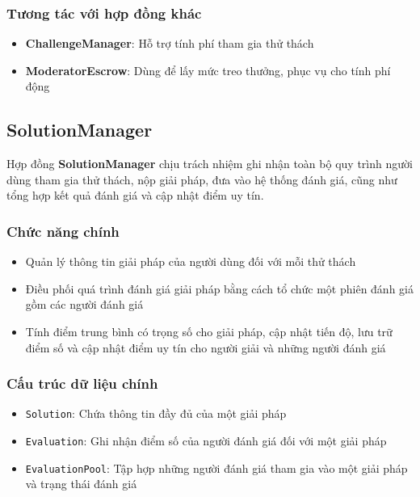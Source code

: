 \subsubsection{Tương tác với hợp đồng khác}

\begin{itemize}
  \item \textbf{ChallengeManager}: Hỗ trợ tính phí tham gia thử thách
  \item \textbf{ModeratorEscrow}: Dùng để lấy mức treo thưởng, phục vụ cho tính phí động
\end{itemize}

\subsection{SolutionManager}

Hợp đồng \textbf{SolutionManager} chịu trách nhiệm ghi nhận toàn bộ quy trình người dùng tham gia thử thách, nộp giải pháp, đưa vào hệ thống đánh giá, cũng như tổng hợp kết quả đánh giá và cập nhật điểm uy tín.

\subsubsection{Chức năng chính}

\begin{itemize}
  \item Quản lý thông tin giải pháp của người dùng đối với mỗi thử thách
  \item Điều phối quá trình đánh giá giải pháp bằng cách tổ chức một phiên đánh giá gồm các người đánh giá
  \item Tính điểm trung bình có trọng số cho giải pháp, cập nhật tiến độ, lưu trữ điểm số và cập nhật điểm uy tín cho người giải và những người đánh giá
\end{itemize}

\subsubsection{Cấu trúc dữ liệu chính}

\begin{itemize}
  \item \texttt{Solution}: Chứa thông tin đầy đủ của một giải pháp
  \item \texttt{Evaluation}: Ghi nhận điểm số của người đánh giá đối với một giải pháp
  \item \texttt{EvaluationPool}: Tập hợp những người đánh giá tham gia vào một giải pháp và trạng thái đánh giá
\end{itemize}


